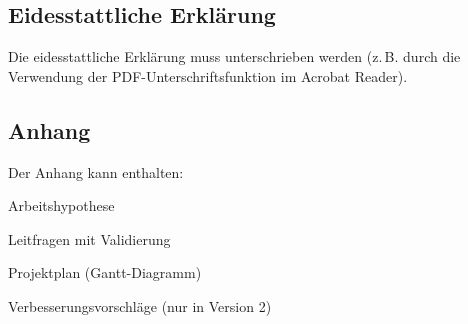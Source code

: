 \subsection*{Eidesstattliche Erklärung}
\label{subsec:erklaerung_struktur}

Die eidesstattliche Erklärung muss unterschrieben werden (z.\,B. durch die Verwendung der PDF-Unterschriftsfunktion im Acrobat Reader).

\subsection*{Anhang}
\label{subsec:anhang_struktur}

Der Anhang kann enthalten:
\begin{listenabsatz}
	\item Arbeitshypothese
	\item Leitfragen mit Validierung
	\item Projektplan (Gantt-Diagramm)
	\item Verbesserungsvorschläge (nur in Version 2)
\end{listenabsatz}

